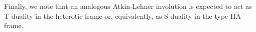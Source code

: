 \documentclass[a4paper,11pt]{article}
\newcommand{\ZZ}{\mathbb{Z}}
\numberwithin{equation}{section}
\def\be{\begin{equation}}
\def\ee{\end{equation}}
\begin{document}
Finally, we note that an analogous Atkin-Lehner involution is expected to act as T-duality in the heterotic frame or, equivalently, as S-duality in the type IIA frame. 

%
%
%
\end{document}
